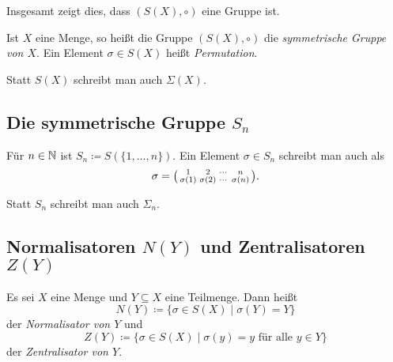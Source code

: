 Insgesamt zeigt dies, dass $(S(X), \circ)$ eine Gruppe ist.

\begin{defi}
 Ist $X$ eine Menge, so heißt die Gruppe $(S(X), \circ)$ die \emph{symmetrische Gruppe von $X$}. Ein Element $\sigma \in S(X)$ heißt \emph{Permutation}.
\end{defi}


\begin{bem}
 Statt $S(X)$ schreibt man auch $\Sigma(X)$.
\end{bem}


\subsection{Die symmetrische Gruppe \texorpdfstring{$S_n$}{Sn}}
Für $n \in \mathbb{N}$ ist $S_n \coloneqq S(\{1, \dotsc, n\})$. Ein Element $\sigma \in S_n$ schreibt man auch als
\[
 \sigma
 =
 \begin{psmallmatrix}
  1         & 2         & \cdots & n \\
  \sigma(1) & \sigma(2) & \cdots & \sigma(n)
 \end{psmallmatrix}.
\]

\begin{bem}
 Statt $S_n$ schreibt man auch $\Sigma_n$.
\end{bem}




\subsection{Normalisatoren \texorpdfstring{$N(Y)$}{N(Y)} und Zentralisatoren \texorpdfstring{$Z(Y)$}{Z(Y)}}


\begin{defi}
 Es sei $X$ eine Menge und $Y \subseteq X$ eine Teilmenge. Dann heißt
 \[
  N(Y) \coloneqq \{\sigma \in S(X) \mid \sigma(Y) = Y\}
 \]
 der \emph{Normalisator von $Y$} und
 \[
  Z(Y)
  \coloneqq
  \{\sigma \in S(X) \mid \text{$\sigma(y) = y$ für alle $y \in Y$}\}
 \]
 der \emph{Zentralisator von $Y$}.
\end{defi}

